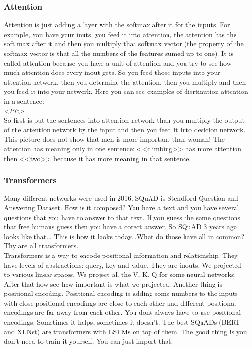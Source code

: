 \subsubsection*{Attention}

Attention is just adding a layer with the softmax after it for the inputs. For example, you have your inuts, you feed it into attention, the attention has the soft max after it and then you multiply that softmax vector (the property of the softmax vector is that all the numbers of the features sumed up to one). It is called attention because you have a unit of attention and you try to see how much attention does every inout gets. So you feed those inputs into your attention network, then you determine the attention, then you multiply and then you feed it into your network. Here you can see examples of disrtinution attention in a sentence:\\
{\it <Pic>}\\
So first is put the sentences into attention network than you multiply the output of the attention network by the input and then you feed it  into desicion network. This picture does not show that men is more important than woman! The attention has meaning only in one sentence: <<climbing>> has more attention then <<two>> because it has more meaning in that sentence. 

\subsubsection*{Transformers}

Many different networks were used in 2016. SQuAD is Stendford Question and Answering Dataset. How is it composed? You have a text and you have several questions that you have to answer to that text. If you guess the same questions that free humans guess then you have a corect answer. So SQuAD 3 years ago looks like that... This is how it looks today...What do those have all in common? Thy are all transformers.\\
Transformers is a way to encode positional information and relationship. They have levels of abstractions: query, key and value. They are inouts. We projected to various linear spaces. We project all the V, K, Q for some neural networks. After that how see how important is what we projected. Another thing is positional encoding. Positional encoding is adding some numbers to the inputs with close positional encodings are close to each other and different positional encodings are far away from each other. You dont always have to use positional encodings. Sometimes it helps, sometimes it doesn't. {\it <Description of pic>} The best SQuADs (BERT and XLNet) are transformers with LSTMs on top of them. The good thing is you don't need to train it yourself. You can just import that.

